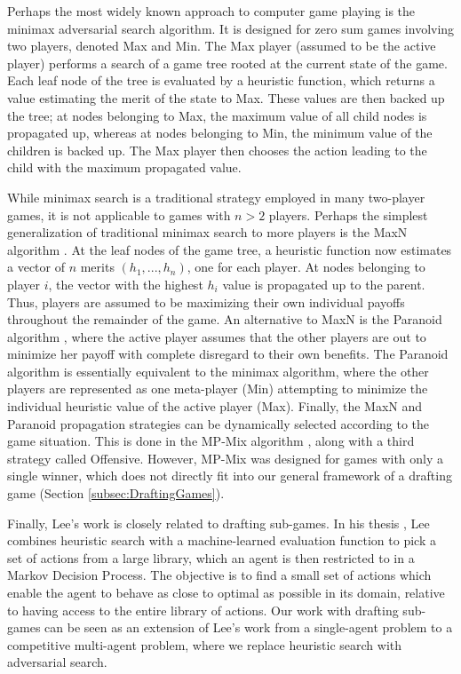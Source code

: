\documentclass[letterpaper]{article}
\numberwithin{equation}{section}
\numberwithin{theorem}{section}
\numberwithin{lemma}{section}
\numberwithin{df}{section}
\begin{document}
Perhaps the most widely known approach to computer game playing is the minimax adversarial search algorithm.  It is designed for zero sum games involving two players, denoted Max and Min.  The Max player (assumed to be the active player) performs a search of a game tree rooted at the current state of the game.  Each leaf node of the tree is evaluated by a heuristic function, which returns a value estimating the merit of the state to Max.  These values are then backed up the tree; at nodes belonging to Max, the maximum value of all child nodes is propagated up, whereas at nodes belonging to Min, the minimum value of the children is backed up.  The Max player then chooses the action leading to the child with the maximum propagated value.


While minimax search is a traditional strategy employed in many two-player games, it is not applicable to games with $n > 2$ players.  Perhaps the simplest generalization of traditional minimax search to more players is the MaxN algorithm \cite{MaxN}.  At the leaf nodes of the game tree, a heuristic function now estimates a vector of $n$ merits $(h_1, ..., h_n)$, one for each player.  At nodes belonging to player $i$, the vector with the highest $h_i$ value is propagated up to the parent.  Thus, players are assumed to be maximizing their own individual payoffs throughout the remainder of the game.  An alternative to MaxN is the Paranoid algorithm \cite{Paranoid}, where the active player assumes that the other players are out to minimize her payoff with complete disregard to their own benefits.  The Paranoid algorithm is essentially equivalent to the minimax algorithm, where the other players are represented as one meta-player (Min) attempting to minimize the individual heuristic value of the active player (Max).  Finally, the MaxN and Paranoid propagation strategies can be dynamically selected according to the game situation.  This is done in the MP-Mix algorithm \cite{ZuckFelnerKraus2009}, along with a third strategy called Offensive.  However, MP-Mix was designed for games with only a single winner, which does not directly fit into our general framework of a drafting game (Section \ref{subsec:DraftingGames}).


Finally, Lee's work is closely related to drafting sub-games.  In his thesis \cite{GregLeeThesis}, Lee combines heuristic search with a machine-learned evaluation function to pick a set of actions from a large library, which an agent is then restricted to in a Markov Decision Process.  The objective is to find a small set of actions which enable the agent to behave as close to optimal as possible in its domain, relative to having access to the entire library of actions.  Our work with drafting sub-games can be seen as an extension of Lee's work from a single-agent problem to a competitive multi-agent problem, where we replace heuristic search with adversarial search. 
\end{document}

